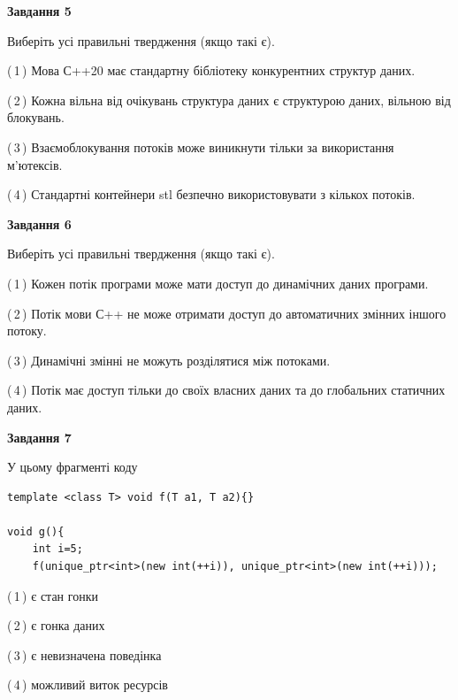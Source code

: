 \documentclass[12pt, ukrainian]{article}
\begin{document}
\begin {large}
{\begin{center}
\textbf{Завдання 5}
\end{center}

Виберіть усі правильні твердження (якщо такі є).\par
\vspace{2mm}

(\,1\,) Мова С++20 має стандартну бібліотеку конкурентних структур даних.%

(\,2\,) Кожна вільна від очікувань структура даних є структурою даних, вільною від блокувань.%

(\,3\,) Взаємоблокування потоків може виникнути тільки за використання м’ютексів.%

(\,4\,) Стандартні контейнери stl безпечно використовувати з кількох потоків.%
\newpage


\begin{center}
\textbf{Завдання 6}
\end{center}

Виберіть усі правильні твердження (якщо такі є).\par
\vspace{2mm}

(\,1\,) Кожен потік програми може мати доступ до динамічних даних програми.%

(\,2\,) Потік мови С++ не може отримати доступ до автоматичних змінних іншого потоку.%

(\,3\,) Динамічні змінні не можуть розділятися між потоками.%

(\,4\,) Потік має доступ тільки до своїх власних даних та до глобальних статичних даних.%


\begin{center}
\textbf{Завдання 7}
\end{center}

У цьому фрагменті коду
\begin{verbatim}
template <class T> void f(T a1, T a2){}

void g(){
    int i=5;
    f(unique_ptr<int>(new int(++i)), unique_ptr<int>(new int(++i)));
\end{verbatim}

(\,1\,) є стан гонки%

(\,2\,) є гонка даних%

(\,3\,) є невизначена поведінка%

(\,4\,) можливий виток ресурсів%

}
\end {large}

\vspace{4mm}
\newpage
\end{document}
